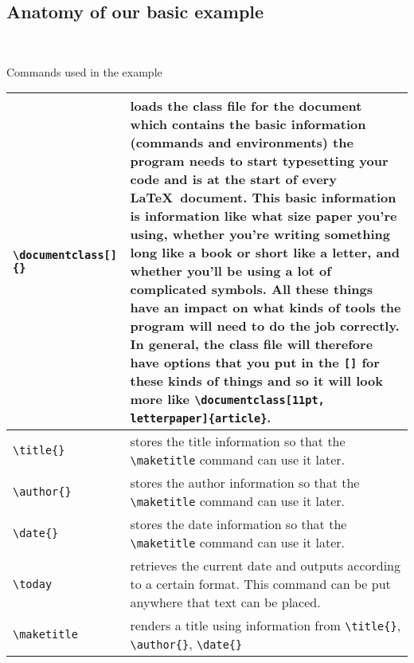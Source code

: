 \subsection{Anatomy of our basic example}
\hfill \\
\begin{center}
\begin{flushright}
{\large  \avantfont Commands used in the example}
\end{flushright}
{\renewcommand{\arraystretch}{1.2}
    \begin{tabular}{  | p{3.5cm } | p{11.5cm}|}
   \hline \hline
	\verb|\documentclass[]{}|		&    {\bf loads the class file for the document which contains the basic information (commands and environments) the program needs to start typesetting your code} and is at the start of every \LaTeX\ document. This basic information is information like what size paper you're using, whether you're writing something long like a book or short like a letter, and whether you'll be using a lot of complicated symbols. All these things have an impact on what kinds of tools the program will need to do the job correctly.  In general, the class file will therefore have options that you put in the \texttt{[]} for these kinds of things and so it will look more like \verb|\documentclass[11pt, letterpaper]{article}|.\\ \hline
	\verb|\title{}|						&  stores the title information so that the \verb|\maketitle| command can use it later.\\ \hline
	\verb|\author{}|					&  stores the author information so that the \verb|\maketitle| command can use it later.\\ \hline
	\verb|\date{}|						&  stores the date information so that the \verb|\maketitle| command can use it later.\\ \hline
	\verb|\today|							&  retrieves the current date and outputs according to a certain format. This command can be put anywhere that text can be placed. \\ \hline
	\verb|\maketitle|					&  renders a title using information from \verb|\title{}|, \verb|\author{}|, \verb|\date{}|\\ \hline

\end{tabular}}
\end{center}
